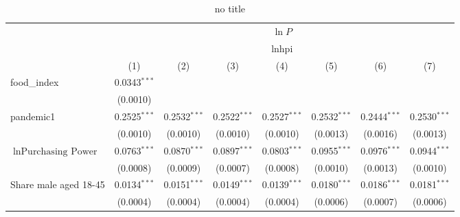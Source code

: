 
\begin{table}[htbp]
   \centering
   \begin{threeparttable}[b]
      \caption{no title}
      \bigskip
      \begin{tabular}{lccccccc}
         \toprule
          & \multicolumn{7}{c}{$\ln P$}\\
          & \multicolumn{7}{c}{lnhpi} \\ 
                                                    & (1)                     & (2)                    & (3)                    & (4)                     & (5)             & (6)             & (7)\\  
         \midrule 
         food\_index                                & 0.0343$^{***}$          &                        &                        &                         &                 &                 &   \\   
                                                    & (0.0010)                &                        &                        &                         &                 &                 &   \\   
         pandemic1                                  & 0.2525$^{***}$          & 0.2532$^{***}$         & 0.2522$^{***}$         & 0.2527$^{***}$          & 0.2532$^{***}$  & 0.2444$^{***}$  & 0.2530$^{***}$\\   
                                                    & (0.0010)                & (0.0010)               & (0.0010)               & (0.0010)                & (0.0013)        & (0.0016)        & (0.0013)\\   
         $\ln \text{Purchasing Power}$              & 0.0763$^{***}$          & 0.0870$^{***}$         & 0.0897$^{***}$         & 0.0803$^{***}$          & 0.0955$^{***}$  & 0.0976$^{***}$  & 0.0944$^{***}$\\   
                                                    & (0.0008)                & (0.0009)               & (0.0007)               & (0.0008)                & (0.0010)        & (0.0013)        & (0.0010)\\   
         Share male aged 18-45                      & 0.0134$^{***}$          & 0.0151$^{***}$         & 0.0149$^{***}$         & 0.0139$^{***}$          & 0.0180$^{***}$  & 0.0186$^{***}$  & 0.0181$^{***}$\\   
                                                    & (0.0004)                & (0.0004)               & (0.0004)               & (0.0004)                & (0.0006)        & (0.0007)        & (0.0006)\\   

\end{tabular}
\end{threeparttable}
\end{table}

